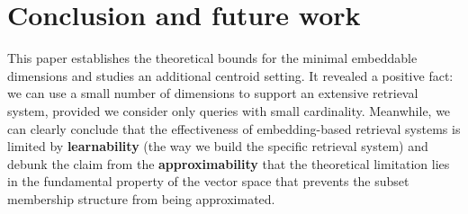 \documentclass[10pt]{article}
\begin{document}










\section{Conclusion and future work}\label{sec:conclusion}

This paper establishes the theoretical bounds for the minimal embeddable dimensions and studies an additional centroid setting. It revealed a positive fact: we can use a small number of  dimensions to support an extensive retrieval system, provided we consider only queries with small cardinality. Meanwhile, we can clearly conclude that the effectiveness of embedding-based retrieval systems is limited by \textbf{learnability} (the way we build the specific retrieval system) and debunk the claim from the \textbf{approximability} that the theoretical limitation lies in the fundamental property of the vector space that prevents the subset membership structure from being approximated.
\end{document}
